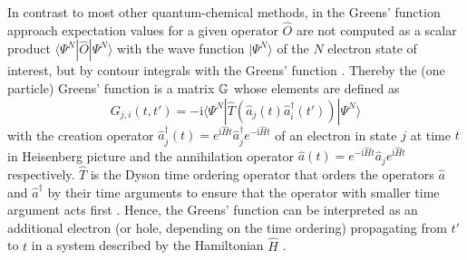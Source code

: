 In contrast to most other quantum-chemical methods, in the Greens' function approach expectation values for a given operator $\hat{O}$ are not computed as a scalar product $\langle \Psi^N |\hat{O} | \Psi^N \rangle $ with the wave function $|\Psi^N\rangle$ of the $N$ electron state of interest, but by contour integrals with the Greens' function \cite{bookGF, 1pGFcederbaum}.
Thereby the (one particle) Greens' function is a matrix $\mathbb{G}$ whose elements are defined as
\begin{equation} \label{eq:defGF}
G_{j,i}(t,t')= -\text{i}\langle \Psi^N | \hat{T}\left(\hat{a}_j(t)\hat{a}_i^\dagger(t')\right)|\Psi^N\rangle 
\end{equation}
with the creation operator $\hat{a}^\dagger_j (t)=e^{\text{i}\hat{H}t}\hat{a}^\dagger_j e^{-\text{i}\hat{H}t}$ of an electron in state $j$ at time $t$ in Heisenberg picture and the annihilation operator $\hat{a}(t)=e^{-\text{i}\hat{H}t}\hat{a}_j e^{\text{i}\hat{H}t}$ respectively.
$\hat{T}$ is the Dyson time ordering operator that orders the operators $\hat{a}$ and $\hat{a}^\dagger$ by their time arguments to ensure that the operator with smaller time argument acts first \cite{bookGF}.
Hence, the Greens' function can be interpreted as an additional electron (or hole, depending on the time ordering) propagating from $t'$ to $t$ in a system described by the Hamiltonian $\hat{H}$ \cite{bookGF}.

